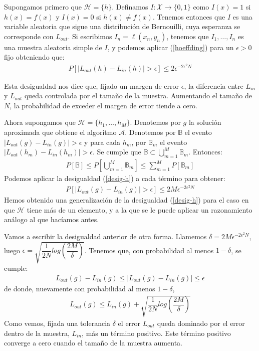 Supongamos primero que $\mathcal{H} = \{ h \}$. Definamos $I: \mathcal{X} \to \{0,1\}$ como $I(x)=1$ si $h(x) = f(x)$ y $I(x) = 0$ si $h(x) \neq f(x)$. Tenemos entonces que $I$ es una variable aleatoria que sigue una distribución de Bernouilli, cuya esperanza se corresponde con $L_{out}$. Si escribimos $I_n=\ell(x_n, y_n)$, tenemos que $I_1, \ldots, I_n$ es una muestra aleatoria simple de $I$, y podemos aplicar (\ref{hoeffding}) para un $\epsilon > 0$ fijo obteniendo que:
\begin{align}\label{desig-h}
	P[ |L_{out}(h) - L_{in}(h)| > \epsilon  ] \leq 2 \epsilon^{-2 \epsilon^2 N}
\end{align}

Esta desigualdad nos dice que, fijado un margen de error $\epsilon$, la diferencia entre $L_{in}$ y $L_{out}$ queda controlada por el tamaño de la muestra. Aumentando el tamaño de $N$, la probabilidad de exceder el margen de error tiende a cero. 

Ahora supongamos que $\mathcal{H} = \{h_1, \ldots, h_M\}$. Denotemos por $g$ la solución aproximada que obtiene el algoritmo $\mathcal{A}$. Denotemos por $\mathbb{B}$ el evento $|L_{out}(g) - L_{in}(g)| > \epsilon$ y para cada $h_m$, por $\mathbb{B}_m$ el evento $|L_{out}(h_m) - L_{in}(h_m)| > \epsilon$. Se cumple que $ \mathbb{B} \subset \bigcup_{m=1}^{M} \mathbb{B}_m$. Entonces:
\begin{align*}
	P[\mathbb{B}] \leq P[\bigcup_{m=1}^{M} \mathbb{B}_m ] \leq \sum_{m=1}^{M} P[ \mathbb{B}_m ]
\end{align*}
Podemos aplicar la desigualdad (\ref{desig-h}) a cada término para obtener:
\begin{align*}
	P[ |L_{out}(g) - L_{in}(g)| > \epsilon ] \leq 2 M \epsilon^{-2 \epsilon^2 N}
\end{align*}
Hemos obtenido una generalización de la desigualdad (\ref{desig-h}) para el caso en que $\mathcal{H}$ tiene más de un elemento, y a la que se le puede aplicar un razonamiento análogo al que hacíamos antes. 

Vamos a escribir la desigualdad anterior de otra forma. Llamemos $\delta = 2 M \epsilon^{-2 \epsilon^2 N}$, luego $\epsilon = \sqrt{ \dfrac{1}{2N} log \left( \dfrac{2M}{\delta} \right) }$. Tenemos que, con probabilidad al menos $1-\delta$, se cumple:
\begin{align*}
	L_{out}(g) - L_{in}(g) \leq |L_{out}(g) - L_{in}(g)| \leq \epsilon
\end{align*}
de donde, nuevamente con probabilidad al menos $1-\delta$,
\begin{align}\label{desig_gen_1}
	L_{out}(g) \leq L_{in}(g) + \sqrt{ \dfrac{1}{2N} log \left( \dfrac{2M}{\delta} \right) }
\end{align}
Como vemos, fijada una tolerancia $\delta$ el error $L_{out}$ queda dominado por el error dentro de la muestra, $L_{in}$, más un término positivo. Este término positivo converge a cero cuando el tamaño de la muestra aumenta.


